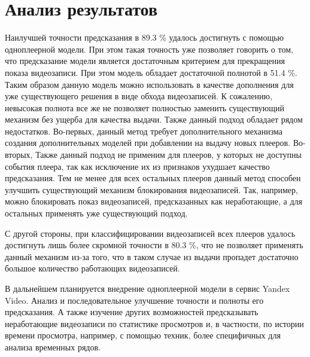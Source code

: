 \chapter{Анализ результатов}

Наилучшей точности предсказания в 89.3 \% удалось достигнуть с помощью одноплеерной модели. При этом такая точность уже позволяет говорить о том, что предсказание модели является достаточным критерием для прекращения показа видеозаписи. При этом модель обладает достаточной полнотой в 51.4 \%. Таким образом данную модель можно использовать в качестве дополнения для уже существующего решения в виде обхода видеозаписей. К сожалению, невысокая полнота все же не позволяет полностью заменить существующий механизм без ущерба для качества выдачи. Также данный подход обладает рядом недостатков. Во-первых, данный метод требует дополнительного механизма создания дополнительных моделей при добавлении на выдачу новых плееров. Во-вторых, Также данный подход не применим для плееров, у которых не доступны события плеера, так как исключение их из признаков ухудшает качество предсказания. Тем не менее для всех остальных плееров данный метод способен улучшить существующий механизм блокирования видеозаписей. Так, например, можно блокировать показ видеозаписей, предсказанных как неработающие, а для остальных применять уже существующий подход.

С другой стороны, при классифицировании видеозаписей всех плееров удалось достигнуть лишь более скромной точности в 80.3 \%, что не позволяет применять данный механизм из-за того, что в таком случае из выдачи пропадет достаточно большое количество работающих видеозаписей.

В дальнейшем планируется внедрение одноплеерной модели в сервис Yandex Video. Анализ и последовательное улучшение точности и полноты его предсказания. А также изучение других возможностей предсказывать неработающие видеозаписи по статистике просмотров и, в частности, по истории времени просмотра, например, с помощью техник, более специфичных для анализа временных рядов.